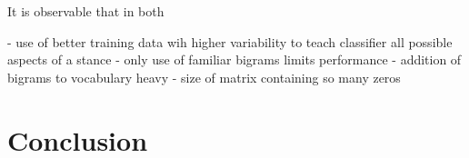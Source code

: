 \documentclass[a4paper,12pt,twoside]{article}
\begin{document}
It is observable that in both 

- use of better training data wih higher variability to teach classifier all possible aspects of a stance
- only use of familiar bigrams limits performance
- addition of bigrams to vocabulary heavy
- size of matrix containing so many zeros



\section{Conclusion}




 
\end{document}
